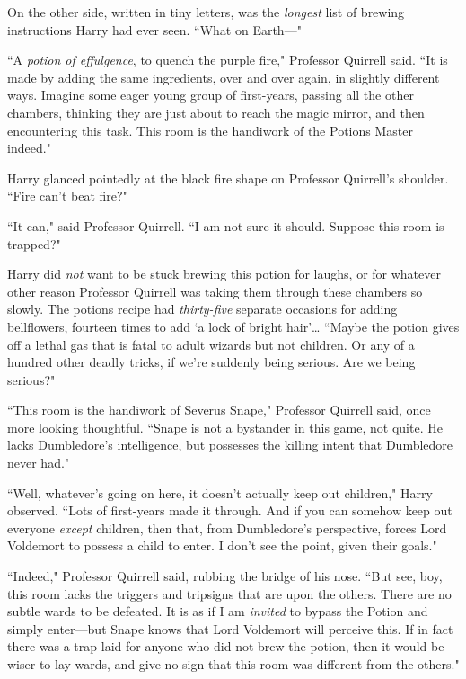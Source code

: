 On the other side, written in tiny letters, was the \emph{longest} list of brewing instructions Harry had ever seen. ``What on Earth—"

``A \emph{potion of effulgence}, to quench the purple fire," Professor Quirrell said. ``It is made by adding the same ingredients, over and over again, in slightly different ways. Imagine some eager young group of first-years, passing all the other chambers, thinking they are just about to reach the magic mirror, and then encountering this task. This room is the handiwork of the Potions Master indeed."

Harry glanced pointedly at the black fire shape on Professor Quirrell's shoulder. ``Fire can't beat fire?"

``It can," said Professor Quirrell. ``I am not sure it should. Suppose this room is trapped?"

Harry did \emph{not} want to be stuck brewing this potion for laughs, or for whatever other reason Professor Quirrell was taking them through these chambers so slowly. The potions recipe had \emph{thirty-five} separate occasions for adding bellflowers, fourteen times to add `a lock of bright hair'{\ldots} ``Maybe the potion gives off a lethal gas that is fatal to adult wizards but not children. Or any of a hundred other deadly tricks, if we're suddenly being serious. Are we being serious?"

``This room is the handiwork of Severus Snape," Professor Quirrell said, once more looking thoughtful. ``Snape is not a bystander in this game, not quite. He lacks Dumbledore's intelligence, but possesses the killing intent that Dumbledore never had."

``Well, whatever's going on here, it doesn't actually keep out children," Harry observed. ``Lots of first-years made it through. And if you can somehow keep out everyone \emph{except} children, then that, from Dumbledore's perspective, forces Lord Voldemort to possess a child to enter. I don't see the point, given their goals."

``Indeed," Professor Quirrell said, rubbing the bridge of his nose. ``But see, boy, this room lacks the triggers and tripsigns that are upon the others. There are no subtle wards to be defeated. It is as if I am \emph{invited} to bypass the Potion and simply enter—but Snape knows that Lord Voldemort will perceive this. If in fact there was a trap laid for anyone who did not brew the potion, then it would be wiser to lay wards, and give no sign that this room was different from the others."

